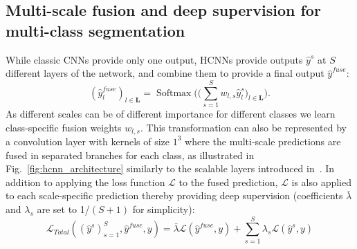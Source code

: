 \documentclass[runningheads,orivec,a4paper]{llncs}
\DeclareMathOperator{\Softmax}{Softmax}
\begin{document}
\subsection{Multi-scale fusion and deep supervision for multi-class segmentation}
While classic CNNs provide only one output, HCNNs
provide outputs $\hat{y}^{s}$ at $S$ different layers of the network,
and combine them to provide a final output $\hat{y}^{fuse}$: 
\[
(\hat{y}_{l}^{fuse})_{l \in \mathbf{L}} = \Softmax\Big(\big(\sum_{s=1}^{S} w_{l,s} \hat{y}_{l}^{s}\big)_{l \in \mathbf{L}}\Big).
\]
As different scales can be of different importance for different
classes we learn class-specific fusion weights $w_{l,s}$. 
This transformation can also be represented by a convolution layer
with kernels of size $1^3$ where the multi-scale
predictions are fused in separated branches for each class, as
illustrated in Fig.~\ref{fig:hcnn_architecture} similarly to the
scalable layers introduced in~\cite{scalenet}. 
%
In addition to applying the loss function $\mathcal{L}$ to the fused
prediction, $\mathcal{L}$ is also applied to each scale-specific
prediction thereby providing deep supervision (coefficients $\bar{\lambda}$ and $\lambda_{s}$ are set to 1/$(S+1)$ for simplicity):
\[
\mathcal{L}_{Total}((\hat{y}^{s})_{s=1}^{S}, \hat{y}^{fuse}, y) = \bar{\lambda}\mathcal{L}(\hat{y}^{fuse}, y) + \sum_{s=1}^{S} \lambda_{s}\mathcal{L}(\hat{y}^{s}, y)
\]
%

\end{document}
